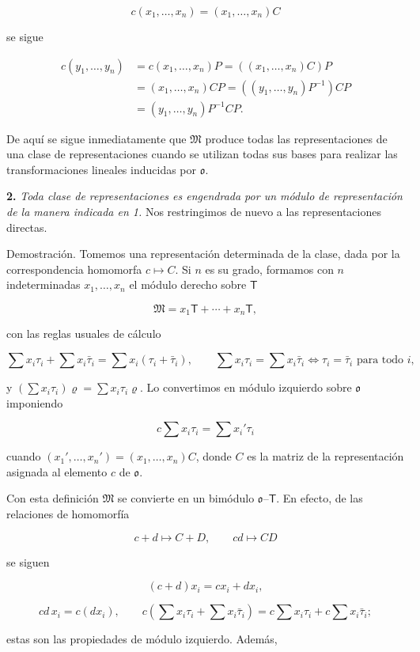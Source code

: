 \[
c(x_1,\ldots,x_n)=(x_1,\ldots,x_n)C
\]

se sigue

\[
\begin{aligned}
c(y_1,\ldots,y_n)
&=c(x_1,\ldots,x_n)P=((x_1,\ldots,x_n)C)P\\
&=(x_1,\ldots,x_n)CP=((y_1,\ldots,y_n)P^{-1})CP\\
&=(y_1,\ldots,y_n)P^{-1}CP.
\end{aligned}
\]

De aquí se sigue inmediatamente que $\mathfrak M$ produce todas las representaciones de una clase de representaciones cuando se utilizan todas sus bases para realizar las transformaciones lineales inducidas por $\mathfrak{o}$.

\textbf{2.} \emph{Toda clase de representaciones es engendrada por un módulo de representación de la manera indicada en 1.} Nos restringimos de nuevo a las representaciones directas.

Demostración. Tomemos una representación determinada de la clase, dada por la correspondencia homomorfa $c\mapsto C$. Si $n$ es su grado, formamos con $n$ indeterminadas $x_1,\ldots,x_n$ el módulo derecho sobre $\mathsf T$

\[
\mathfrak M=x_1\mathsf T+\cdots+x_n\mathsf T,
\]

con las reglas usuales de cálculo

\[
\sum x_i\tau_i+\sum x_i\bar\tau_i=\sum x_i(\tau_i+\bar\tau_i),
\qquad
\sum x_i\tau_i=\sum x_i\bar\tau_i\iff \tau_i=\bar\tau_i\text{ para todo }i,
\]

y $(\sum x_i\tau_i)\varrho=\sum x_i\tau_i\varrho$. Lo convertimos en módulo izquierdo sobre $\mathfrak{o}$ imponiendo

\[
c\sum x_i\tau_i=\sum x_i'\tau_i
\]

cuando $(x_1',\ldots,x_n')=(x_1,\ldots,x_n)C$, donde $C$ es la matriz de la representación asignada al elemento $c$ de $\mathfrak{o}$.

Con esta definición $\mathfrak M$ se convierte en un bimódulo $\mathfrak{o}$--$\mathsf T$. En efecto, de las relaciones de homomorfía

\[
c+d\mapsto C+D,\qquad cd\mapsto CD
\]

se siguen

\[
(c+d)x_i=cx_i+dx_i,
\]

\[
cd\,x_i=c(dx_i),\qquad
c\left(\sum x_i\tau_i+\sum x_i\bar\tau_i\right)
=c\sum x_i\tau_i+c\sum x_i\bar\tau_i;
\]

estas son las propiedades de módulo izquierdo. Además,

